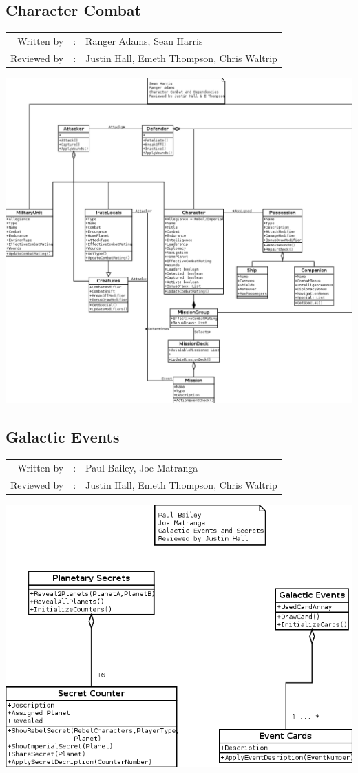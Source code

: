 \documentclass[12pt,letterpaper]{article}
\begin{document}
	\subsection{Character Combat}
	\begin{tabularx}{\linewidth}{rcX}
				Written by & : & Ranger Adams, Sean Harris \\
				Reviewed by & : & Justin Hall, Emeth Thompson, Chris Waltrip  
	\end{tabularx}
		\includegraphics[width=\textwidth,height=\textheight,keepaspectratio]{./images/character_combat}
	\pagebreak
	\subsection{Galactic Events}
	\begin{tabularx}{\linewidth}{rcX}
				Written by & : & Paul Bailey, Joe Matranga \\
				Reviewed by & : & Justin Hall, Emeth Thompson, Chris Waltrip  
	\end{tabularx}
		\includegraphics[width=\textwidth,height=\textheight,keepaspectratio]{./images/galactic_events}	
		\pagebreak
		
\end{document}
